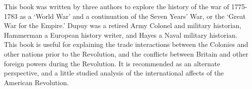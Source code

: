 This book was written by three authors to explore the history of the war of
1775-1783 as a `World War' and a continuation of the Seven Years' War, or the
`Great War for the Empire.' Dupuy was a retired Army Colonel and military
historian, Hammerman a European history writer, and Hayes a Naval military
historian. This book is useful for explaining the trade interactions between the
Colonies and other nations prior to the Revolution, and the conflicts between
Britain and other foreign powers during the Revolution. It is recommended as an
alternate perspective, and a little studied analysis of the international
affects of the American Revolution.
